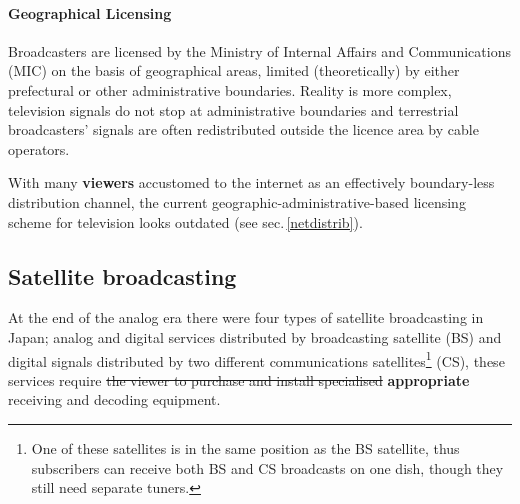 \documentclass[11pt, oneside, a4paper, headsepline]{scrartcl}
\begin{document}
\paragraph{Geographical Licensing} Broadcasters are licensed by the Ministry of Internal Affairs and Communications (MIC) on the basis of geographical areas, limited (theoretically) by either prefectural or other administrative boundaries. %
Reality is more complex, television signals do not stop at administrative boundaries and terrestrial broadcasters' signals are often redistributed outside the licence area by cable operators. 

With many \textbf{viewers} accustomed to the internet as an effectively boundary-less distribution channel, the current geographic-administrative-based licensing scheme for television looks outdated (see sec.\,\ref{netdistrib}). %



\subsection{Satellite broadcasting}
At the end of the analog era there were four types of satellite broadcasting in Japan; analog and digital services distributed by broadcasting satellite (BS) and digital signals distributed by two different communications satellites\footnote{One of these satellites is in the same position as the BS satellite, thus subscribers can receive both BS and CS broadcasts on one dish, though they still need separate tuners.} (CS), these services require \st{the viewer to purchase and install specialised} \textbf{appropriate} receiving and decoding equipment. 
\end{document}
